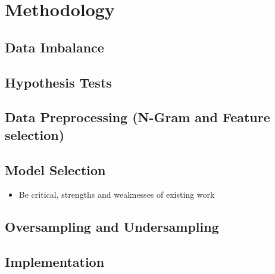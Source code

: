   
\section{Methodology}
\subsection{Data Imbalance}
\subsection{Hypothesis Tests}
\subsection{Data Preprocessing (N-Gram and Feature selection)}
\subsection{Model Selection}
\begin{itemize}
    \item Be critical, strengths and weaknesses of existing work
\end{itemize}
\subsection{Oversampling and Undersampling}
\subsection{Implementation}